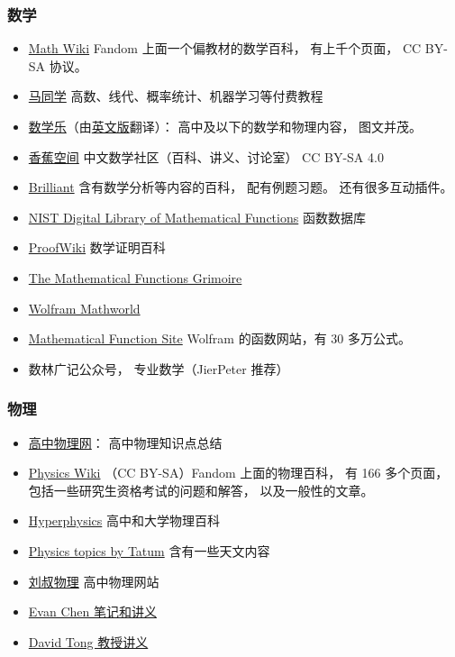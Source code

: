 \subsubsection{数学}
\begin{itemize}
\item \href{https://math.fandom.com/}{Math Wiki} Fandom 上面一个偏教材的数学百科， 有上千个页面， CC BY-SA 协议。
\item \href{https://www.matongxue.com}{马同学} 高数、线代、概率统计、机器学习等付费教程 %
\item \href{https://www.shuxuele.com}{数学乐}（由\href{https://www.mathsisfun.com}{英文版}翻译）： 高中及以下的数学和物理内容， 图文并茂。
\item \href{https://www.bananaspace.org/wiki}{香蕉空间} 中文数学社区（百科、讲义、讨论室） CC BY-SA 4.0
\item \href{https://brilliant.org}{Brilliant} 含有数学分析等内容的百科， 配有例题习题。 还有很多互动插件。
\item \href{https://dlmf.nist.gov}{NIST Digital Library of Mathematical Functions} 函数数据库
\item \href{https://proofwiki.org/wiki/Main_Page}{ProofWiki} 数学证明百科
\item \href{https://fungrim.org}{The Mathematical Functions Grimoire}
\item \href{https://mathworld.wolfram.com}{Wolfram Mathworld}
\item \href{https://functions.wolfram.com/}{Mathematical Function Site} Wolfram 的函数网站，有 30 多万公式。
\item 数林广记公众号， 专业数学（JierPeter 推荐）
\end{itemize}

\subsubsection{物理}
\begin{itemize}
\item \href{http://gaozhongwuli.com}{高中物理网}： 高中物理知识点总结
\item \href{http://www.example.com}{Physics Wiki} （CC BY-SA）Fandom 上面的物理百科， 有 166 多个页面， 包括一些研究生资格考试的问题和解答， 以及一般性的文章。
\item \href{http://hyperphysics.phy-astr.gsu.edu}{Hyperphysics} 高中和大学物理百科
\item \href{http://www.astro.uvic.ca/~tatum/index.php}{Physics topics by Tatum} 含有一些天文内容
\item \href{http://www.myliushu.com}{刘叔物理} 高中物理网站
\item \href{https://web.evanchen.cc/coursework.html}{Evan Chen 笔记和讲义}
\item \href{http://www.damtp.cam.ac.uk/user/tong/teaching.html}{David Tong 教授讲义}
\end{itemize}

